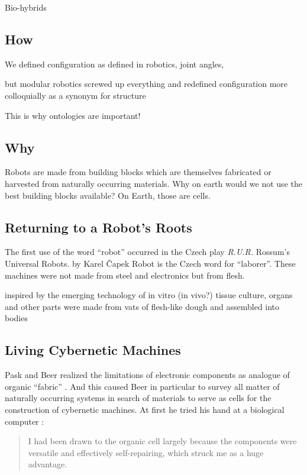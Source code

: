 Bio-hybrids \cite{cvetkovic2014three,raman2016optogenetic,nawroth2012tissue,park2016phototactic,ricotti2017biohybrid}


\subsection{How}


We defined configuration as defined in robotics, joint angles, 

but modular robotics screwed up everything and redefined configuration more colloquially as a synonym for structure

This is why ontologies are important!


\subsection{Why}

Robots are made from building blocks which are themselves fabricated or harvested from naturally occurring materials.
Why on earth would we not use the best building blocks available?
On Earth, those are cells.



\subsection{Returning to a Robot's Roots}

The first use of the word ``robot'' occurred in the Czech
play \textit{R.U.R.}
Rossum's Universal Robots.
by Karel \v{C}apek
Robot is the Czech word for ``laborer''.
These machines were not made from steel
and electronics
but from flesh.

\cite{ball2020living}

inspired by the emerging technology of 
in vitro (in vivo?) tissue culture,
organs and other parts were made from vats of flesh-like dough and assembled into bodies



\subsection{Living Cybernetic Machines}

Pask and Beer realized the limitations of 
electronic components 
as analogue of organic ``fabric'' \cite{beer1960cybernetics}.
And this caused Beer in particular to survey all matter of naturally occurring systems in search of materials to serve as cells for the construction of cybernetic machines.
At first he tried his hand at a biological computer
\cite{beer1960cybernetics}:
\begin{quote}
\small
I had been drawn to the organic cell largely because the components were versatile and effectively self-repairing, which struck me as a huge advantage.
\end{quote}



